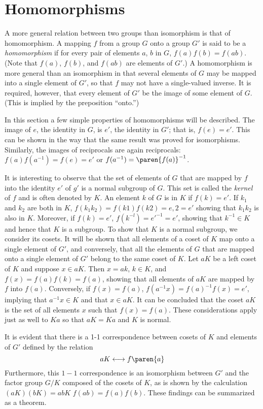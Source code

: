 \section{Homomorphisms}

A more general relation between two groups than isomorphism is that of homomorphism. A mapping $f$ from a group $G$ onto a group $G'$ is said to be a \emph{homomorphism} if for every pair of elements $a$, $b$ in $G$, $f(a)f(b) = f(ab)$.	(Note that $f(a)$, $f(b)$, and $f(ab)$ are elements of $G'$.) A homomorphism is more general than an isomorphism in that several elements of $G$ may be mapped into a single element of $G'$, so that $f$ may not have a single-valued inverse. It is required, however, that every element of $G'$ be the image of some element of $G$.	(This is implied by the preposition ``onto.'')

In this section a few simple properties of homomorphisms will be described. The image of $e$, the identity in $G$, is $e'$, the identity in $G'$; that is, $f(e) = e'$. This can be shown in the way that the same result was proved for isomorphisms. Similarly, the images of reciprocals are again reciprocals:	$f(a)f(a^{-1}) = f(e) = e'$ or $f(a^{-1}) = \paren{f(a)}^{-1}$.

It is interesting to observe that the set of elements of $G$ that are mapped by $f$ into the identity $e'$ of $g'$ is a normal subgroup of $G$. This set is called the \emph{kernel} of $f$ and is often denoted by $K$. An element $k$ of $G$ is in $K$ if $f(k)=e'$. If $k_{1}$ and $k_{2}$ are both in $K$, $f(k_{1}k_{2})=f(k1)f(k2) = e,2 = e'$ showing that $k_{1}k_{2}$ is also in $K$. Moreover, if $f(k) = e'$, $f(k^{-l}) = e'^{-1} =e'$, showing that $k^{-1} \in K$ and hence that $K$ is a subgroup. To show that $K$ is a normal subgroup, we consider its cosets. It will be shown that all elements of a coset of $K$ map onto a single element of $G'$, and conversely, that all the elements of $G$ that are mapped onto a single element of $G'$ belong to the same coset of $K$. Let $aK$ be a left coset of $K$ and suppose $x\in  aK$. Then $x= ak$, $k \in  K$, and $f(x) =f(a)f(k) =f(a)$, showing that all elements of $aK$ are mapped by $f$ into $f(a)$. Conversely, if $f(x) = f(a)$, $f(a^{-1}x) = f(a)^{-1}f(x) = e'$, implying that $a^{-1}x \in  K$ and that $x \in  aK$. It can be concluded that the coset $aK$ is the set of all elements $x$ such that $f(x) = f(a)$. These considerations apply just as well to $Ka$ so that $aK = Ka$ and $K$ is normal.

It is evident that there is a 1-1 correspondence between cosets of $K$ and elements of $G'$ defined by the relation
\begin{equation}
  aK \longleftrightarrow f\paren{a} 
  \label{eq:2.4}
\end{equation}
Furthermore, this $1-1$ correspondence is an isomorphism between $G'$ and the factor group $G/K$ composed of the cosets of $K$, as is shown by the calculation $(aK) (bK) = abK$ {}	$f(ab) = f(a)f(b)$. These findings can be summarized as a theorem.

